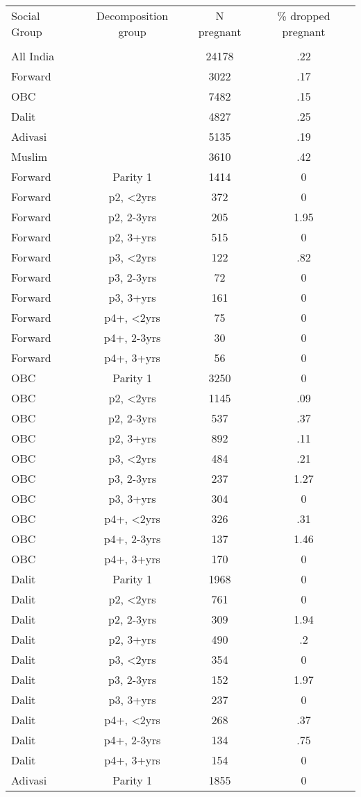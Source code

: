 \begin{tabular}{lccc}
\toprule
Social Group & Decomposition group & N pregnant & \% dropped pregnant \\\\
\midrule
All India&&24178&.22\\
Forward&&3022&.17\\
OBC&&7482&.15\\
Dalit&&4827&.25\\
Adivasi&&5135&.19\\
Muslim&&3610&.42\\
Forward&Parity 1&1414&0\\
Forward&p2, <2yrs&372&0\\
Forward&p2, 2-3yrs&205&1.95\\
Forward&p2, 3+yrs&515&0\\
Forward&p3, <2yrs&122&.82\\
Forward&p3, 2-3yrs&72&0\\
Forward&p3, 3+yrs&161&0\\
Forward&p4+, <2yrs&75&0\\
Forward&p4+, 2-3yrs&30&0\\
Forward&p4+, 3+yrs&56&0\\
OBC&Parity 1&3250&0\\
OBC&p2, <2yrs&1145&.09\\
OBC&p2, 2-3yrs&537&.37\\
OBC&p2, 3+yrs&892&.11\\
OBC&p3, <2yrs&484&.21\\
OBC&p3, 2-3yrs&237&1.27\\
OBC&p3, 3+yrs&304&0\\
OBC&p4+, <2yrs&326&.31\\
OBC&p4+, 2-3yrs&137&1.46\\
OBC&p4+, 3+yrs&170&0\\
Dalit&Parity 1&1968&0\\
Dalit&p2, <2yrs&761&0\\
Dalit&p2, 2-3yrs&309&1.94\\
Dalit&p2, 3+yrs&490&.2\\
Dalit&p3, <2yrs&354&0\\
Dalit&p3, 2-3yrs&152&1.97\\
Dalit&p3, 3+yrs&237&0\\
Dalit&p4+, <2yrs&268&.37\\
Dalit&p4+, 2-3yrs&134&.75\\
Dalit&p4+, 3+yrs&154&0\\
Adivasi&Parity 1&1855&0\\

\end{tabular}
